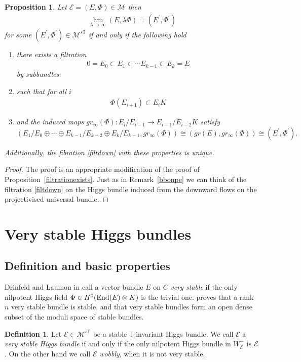 \documentclass[12pt]{article}
\numberwithin{equation}{section}
\newtheorem{proposition}[theorem]{Proposition}
\theoremstyle{remark}
\theoremstyle{definition}
\newtheorem{definition}[theorem]{Definition}
\numberwithin{theorem}{section}
\def\beq{\begin{eqnarray}}
\def\eeq{\end{eqnarray}}
\def\bes{\begin{eqnarray*}}
\def\ees{\end{eqnarray*}}
\def\calE{{\mathcal E}}
\def\M{{\mathcal{M}}}
\newcommand{\T}{{\mathbb{T}}}
\newcommand{\End}{\textnormal{End}}
\renewcommand{\1}{\mathbbm{1}}
\begin{document}
\begin{proposition}\label{downwardfiltration} Let $\calE=(E,\Phi)\in \M$ then \bes\label{limitup}\lim_{\lambda \to \infty} (E,\lambda\Phi)=(E^\prime,\Phi^\prime)\ees for some   $(E^\prime,\Phi^\prime)\in \M^{s\T}$ if and only if the following hold 
	\begin{enumerate} \item there exists a filtration \beq\label{filtdown}0=E_0\subset E_1\subset \cdots E_{k-1}\subset E_k = E\eeq by subbundles \item such that for all $i$ \bes\label{compdown}\Phi(E_{i+1})\subset E_{i}K\ees \item and the induced maps $gr_\infty(\Phi):E_i/E_{i-1}\to E_{i-1}/E_{i-2}K$ satisfy $$(E_1/E_0\oplus \cdots\oplus E_{k-1}/E_{k-2}\oplus  E_k/E_{k-1},gr_\infty(\Phi))\cong (gr(E),gr_\infty(\Phi))\cong(E^\prime,\Phi^\prime).$$
		\end{enumerate}
	
	Additionally, the fibration \eqref{filtdown} with these properties is unique. 
\end{proposition}

\begin{proof} The proof is an appropriate modification of the proof of Proposition~\ref{filtrationexists}.  
	Just as in Remark~\ref{bbonpe} we can think of the filtration  \eqref{filtdown} on the Higgs bundle induced from the downward flows on the projectivised universal bundle. 
\end{proof}
 
	\section{Very stable Higgs bundles}
\label{verystable}


\subsection{Definition and basic properties} 
Drinfeld and Laumon in \cite[Definition 3.4]{laumon} call a vector bundle $E$ on $C$ {\em very stable} if the only nilpotent Higgs field $\Phi
\in H^0(\End(E)\otimes K)$ is the trivial one.  \cite[Proposition 3.5]{laumon} proves that a rank $n$ very stable bundle is stable, and that very stable bundles form an open dense subset of the moduli space of stable  bundles. 

\begin{definition} Let $\calE\in \M^{s \T}$ be a stable $\T$-invariant Higgs bundle. We call $\calE$ a {\em very stable Higgs bundle} if and only if  the only nilpotent Higgs bundle in $W_\calE^+$ is $\calE$.  On the other hand we call $\calE$ {\em wobbly}, when it is not very stable. 
\end{definition}
\end{document}
